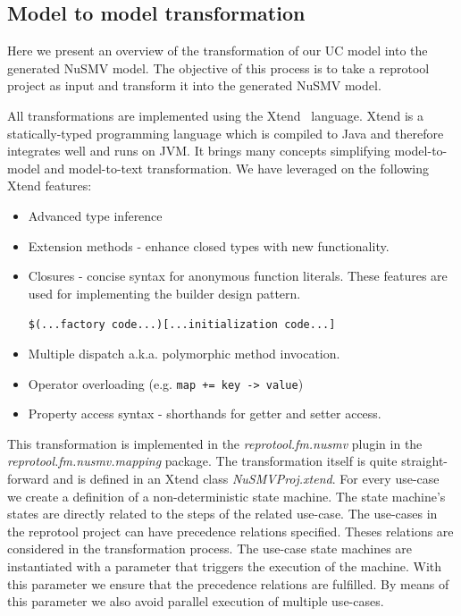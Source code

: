 \subsection{Model to model transformation}

Here we present an overview of the transformation of our UC model into the generated NuSMV model. The objective of this process is to take a reprotool project as input and transform it into the generated NuSMV model.

All transformations are implemented using the Xtend~\cite{Xtend-website} language.
Xtend is a statically-typed programming language which is compiled to Java and therefore integrates well and runs on JVM. It brings many concepts simplifying model-to-model and model-to-text transformation. We have leveraged on the following Xtend features: 
\begin{itemize}
	\item Advanced type inference
	\item Extension methods - enhance closed types with new functionality.
	\item Closures - concise syntax for anonymous function literals.
		These features are used for implementing the builder design pattern.
	
		\verb|$(...factory code...)[...initialization code...]|
	
	\item Multiple dispatch a.k.a. polymorphic method invocation.
	\item Operator overloading (e.g. \verb|map += key -> value|)
	\item Property access syntax - shorthands for getter and setter access.
\end{itemize}

This transformation is implemented in the \emph{reprotool.fm.nusmv} plugin in the \emph{reprotool.fm.nusmv.mapping} package.
The transformation itself is quite straight-forward and is defined in an Xtend class \emph{NuSMVProj.xtend}.
For every use-case we create a definition of a non-deterministic state machine.
The state machine's states are directly related to the steps of the related use-case.
The use-cases in the reprotool project can have precedence relations specified. Theses relations are considered in the
transformation process. The use-case state machines are instantiated with a parameter that triggers the execution of the machine.
With this parameter we ensure that the precedence relations are fulfilled. By means of this parameter we also avoid parallel execution
of multiple use-cases.

